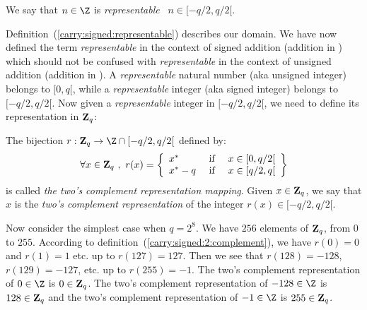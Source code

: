 \documentclass{article}
\newcommand{\zq}{\mbox{${\bf Z}_{q}$}}
\begin{document}
\begin{defin}\label{carry:signed:representable}
We say that $n\in\Z$ is {\em representable} \ifand\ $n\in[-q/2,q/2[$.
\end{defin}
 
Definition~(\ref{carry:signed:representable}) describes our domain. We
have now defined the term {\em representable} in the context of signed 
addition (addition in \Z) which should not be confused with 
{\em representable} in the context of unsigned addition (addition in \N).
A {\em representable} natural number (aka unsigned integer) belongs to 
$[0,q[$, while a {\em representable} integer (aka signed integer) belongs
to $[-q/2,q/2[$. Now given a {\em representable} integer in $[-q/2,q/2[$,
we need to define its representation in \zq:

\begin{defin}\label{carry:signed:2:complement}
The bijection $r:\zq\rightarrow\Z\cap[-q/2,q/2[$ defined by:
  \[
    \forall x\in\zq\ ,\ r(x)=
      \left\{
          \begin{array}{lcr}
          x^{*}&\mbox{\ if\ }&x\in[0,q/2[\\
          x^{*}-q&\mbox{\ if\ }&x\in[q/2,q[
        \end{array}
      \right\}
  \]
is called {\em the two's complement representation mapping}. Given $x\in\zq$,
  we say that $x$ is the {\em two's complement representation} of the 
  integer $r(x)\in[-q/2,q/2[$.
\end{defin}

Now consider the simplest case when $q=2^8$. We have $256$ elements of \zq, 
from $0$ to $255$. According to definition~(\ref{carry:signed:2:complement}),
we have $r(0)=0$ and $r(1) = 1$ etc. up to $r(127)=127$. Then we see that 
$r(128)=-128$, $r(129)=-127$, etc. up to $r(255)=-1$. The two's complement
representation of $0\in\Z$ is $0\in\zq$. The two's complement representation
of $-128\in\Z$ is $128\in\zq$ and the two's complement representation of 
$-1\in\Z$ is $255\in\zq$.
\end{document}
